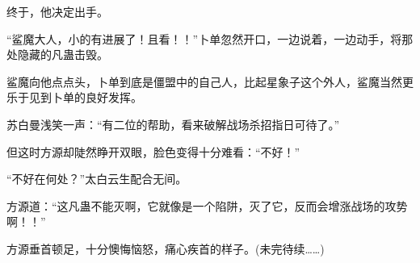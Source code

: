 \begin{this_body}
终于，他决定出手。

“鲨魔大人，小的有进展了！且看！！”卜单忽然开口，一边说着，一边动手，将那处隐藏的凡蛊击毁。

鲨魔向他点点头，卜单到底是僵盟中的自己人，比起星象子这个外人，鲨魔当然更乐于见到卜单的良好发挥。

苏白曼浅笑一声：“有二位的帮助，看来破解战场杀招指日可待了。”

但这时方源却陡然睁开双眼，脸色变得十分难看：“不好！”

“不好在何处？”太白云生配合无间。

方源道：“这凡蛊不能灭啊，它就像是一个陷阱，灭了它，反而会增涨战场的攻势啊！！”

方源垂首顿足，十分懊悔恼怒，痛心疾首的样子。(未完待续……)

\end{this_body}

